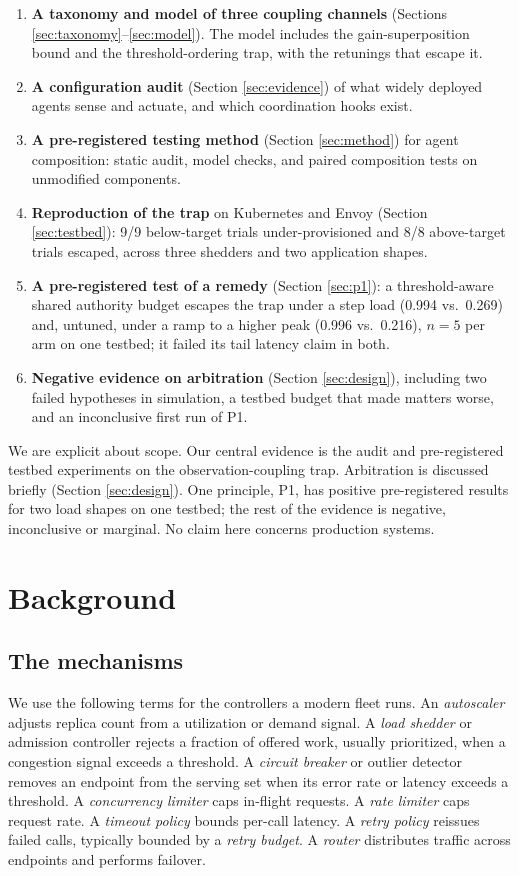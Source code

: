 \documentclass[conference]{IEEEtran}
\begin{document}
\begin{enumerate}
\item \textbf{A taxonomy and model of three coupling channels} (Sections
\ref{sec:taxonomy}--\ref{sec:model}). The model includes the gain-superposition
bound and the threshold-ordering trap, with the retunings that escape it.
\item \textbf{A configuration audit} (Section \ref{sec:evidence}) of what
widely deployed agents sense and actuate, and which coordination hooks exist.
\item \textbf{A pre-registered testing method} (Section \ref{sec:method}) for
agent composition: static audit, model checks, and paired composition tests
on unmodified components.
\item \textbf{Reproduction of the trap} on Kubernetes and Envoy (Section
\ref{sec:testbed}): 9/9 below-target trials under-provisioned and 8/8
above-target trials escaped, across three shedders and two application shapes.
\item \textbf{A pre-registered test of a remedy} (Section
\ref{sec:p1}): a threshold-aware shared authority budget escapes the trap
under a step load (0.994 vs.\ 0.269) and, untuned, under a ramp to a higher
peak (0.996 vs.\ 0.216), $n=5$ per arm on one testbed; it failed its tail
latency claim in both.
\item \textbf{Negative evidence on arbitration} (Section
\ref{sec:design}), including two failed hypotheses in simulation, a testbed
budget that made matters worse, and an inconclusive first run of P1.
\end{enumerate}

We are explicit about scope. Our central evidence is the audit and pre-registered testbed experiments on
the observation-coupling trap. Arbitration is discussed briefly (Section \ref{sec:design}). One
principle, P1, has positive pre-registered results for two load shapes on one testbed; the rest
of the evidence is negative, inconclusive or marginal. No claim here concerns
production systems.

\section{Background}
\label{sec:background}

\subsection{The mechanisms}

We use the following terms for the controllers a modern fleet runs. An
\emph{autoscaler} adjusts replica count from a utilization or demand signal.
A \emph{load shedder} or admission controller rejects a fraction of offered
work, usually prioritized, when a congestion signal exceeds a threshold. A
\emph{circuit breaker} or outlier detector removes an endpoint from the
serving set when its error rate or latency exceeds a threshold. A
\emph{concurrency limiter} caps in-flight requests. A \emph{rate limiter}
caps request rate. A \emph{timeout policy} bounds per-call latency. A
\emph{retry policy} reissues failed calls, typically bounded by a
\emph{retry budget}. A \emph{router} distributes traffic across endpoints and
performs failover.
\end{document}
